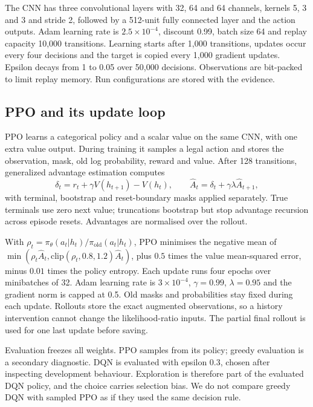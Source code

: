 \documentclass[10pt]{article}
\begin{document}
The CNN has three convolutional layers with 32, 64 and 64 channels, kernels 5, 3 and 3 and stride 2, followed by a 512-unit fully connected layer and the action outputs. Adam \citep{kingma2015} learning rate is $2.5\times10^{-4}$, discount 0.99, batch size 64 and replay capacity 10,000 transitions. Learning starts after 1,000 transitions, updates occur every four decisions and the target is copied every 1,000 gradient updates. Epsilon decays from 1 to 0.05 over 50,000 decisions. Observations are bit-packed to limit replay memory. Run configurations are stored with the evidence.

\subsection{PPO and its update loop}
PPO learns a categorical policy and a scalar value on the same CNN, with one extra value output. During training it samples a legal action and stores the observation, mask, old log probability, reward and value. After 128 transitions, generalized advantage estimation computes
\begin{equation}
\delta_t=r_t+\gamma V(h_{t+1})-V(h_t),\qquad
\hat A_t=\delta_t+\gamma\lambda\hat A_{t+1},
\end{equation}
with terminal, bootstrap and reset-boundary masks applied separately. True terminals use zero next value; truncations bootstrap but stop advantage recursion across episode resets. Advantages are normalised over the rollout.

With $\rho_t=\pi_\theta(a_t|h_t)/\pi_{\mathrm{old}}(a_t|h_t)$, PPO minimises the negative mean of $\min(\rho_t\hat A_t,\mathrm{clip}(\rho_t,0.8,1.2)\hat A_t)$, plus $0.5$ times the value mean-squared error, minus $0.01$ times the policy entropy. Each update runs four epochs over minibatches of 32. Adam learning rate is $3\times10^{-4}$, $\gamma=0.99$, $\lambda=0.95$ and the gradient norm is capped at 0.5. Old masks and probabilities stay fixed during each update. Rollouts store the exact augmented observations, so a history intervention cannot change the likelihood-ratio inputs. The partial final rollout is used for one last update before saving.

Evaluation freezes all weights. PPO samples from its policy; greedy evaluation is a secondary diagnostic. DQN is evaluated with epsilon 0.3, chosen after inspecting development behaviour. Exploration is therefore part of the evaluated DQN policy, and the choice carries selection bias. We do not compare greedy DQN with sampled PPO as if they used the same decision rule.
\end{document}
